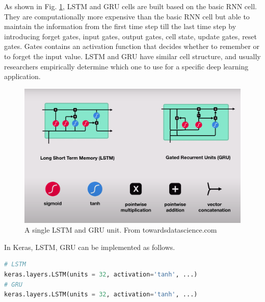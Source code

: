 As shown in Fig. \ref{fig_LSTM_GRU}, LSTM and GRU cells are built based on the basic RNN cell. They are computationally more expensive than the basic RNN cell but able to maintain the information from the first time step till the last time step by introducing forget gates, input gates, output gates, cell state, update gates, reset gates. Gates contains an activation function that decides whether to remember or to forget the input value. LSTM and GRU have similar cell structure, and usually researchers empirically determine which one to use for a specific deep learning application.
\begin{figure}[h!]
\begin{center}
\includegraphics[width = 13cm]{img/LSTM_GRU.png}
\caption[A single LSTM and GRU uni]{A single LSTM and GRU unit. From towardsdatascience.com \label{fig_LSTM_GRU}}
\end{center}
\end{figure}

In Keras, LSTM, GRU can be implemented as follows.
\begin{lstlisting}[language=python,frame=single]
# LSTM
keras.layers.LSTM(units = 32, activation='tanh', ...)
# GRU
keras.layers.LSTM(units = 32, activation='tanh', ...)
\end{lstlisting}
